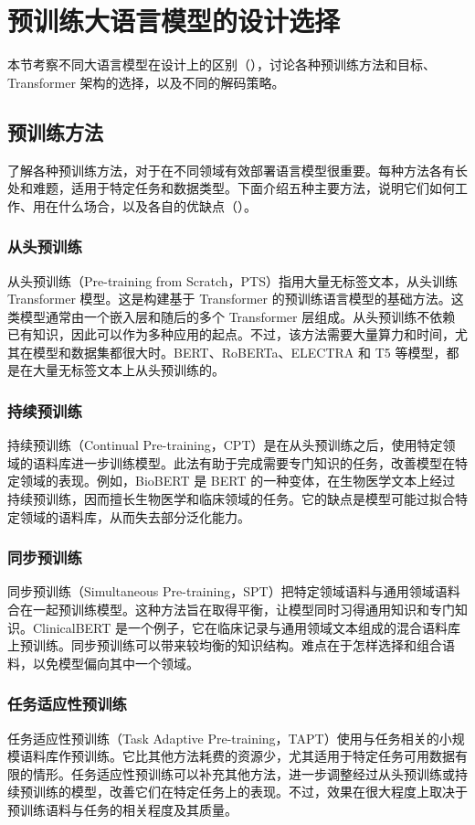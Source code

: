\section{预训练大语言模型的设计选择}
本节考察不同大语言模型在设计上的区别（），讨论各种预训练方法和目标、Transformer 架构的选择，以及不同的解码策略。

\subsection{预训练方法}
了解各种预训练方法，对于在不同领域有效部署语言模型很重要。每种方法各有长处和难题，适用于特定任务和数据类型。下面介绍五种主要方法，说明它们如何工作、用在什么场合，以及各自的优缺点（）。

\subsubsection{从头预训练}
从头预训练（Pre-training from Scratch，PTS）指用大量无标签文本，从头训练 Transformer 模型。这是构建基于 Transformer 的预训练语言模型的基础方法。这类模型通常由一个嵌入层和随后的多个 Transformer 层组成。从头预训练不依赖已有知识，因此可以作为多种应用的起点。不过，该方法需要大量算力和时间，尤其在模型和数据集都很大时。BERT、RoBERTa、ELECTRA 和 T5 等模型，都是在大量无标签文本上从头预训练的。

\subsubsection{持续预训练}
持续预训练（Continual Pre-training，CPT）是在从头预训练之后，使用特定领域的语料库进一步训练模型。此法有助于完成需要专门知识的任务，改善模型在特定领域的表现。例如，BioBERT 是 BERT 的一种变体，在生物医学文本上经过持续预训练，因而擅长生物医学和临床领域的任务。它的缺点是模型可能过拟合特定领域的语料库，从而失去部分泛化能力。

\subsubsection{同步预训练}
同步预训练（Simultaneous Pre-training，SPT）把特定领域语料与通用领域语料合在一起预训练模型。这种方法旨在取得平衡，让模型同时习得通用知识和专门知识。ClinicalBERT 是一个例子，它在临床记录与通用领域文本组成的混合语料库上预训练。同步预训练可以带来较均衡的知识结构。难点在于怎样选择和组合语料，以免模型偏向其中一个领域。

\subsubsection{任务适应性预训练}
任务适应性预训练（Task Adaptive Pre-training，TAPT）使用与任务相关的小规模语料库作预训练。它比其他方法耗费的资源少，尤其适用于特定任务可用数据有限的情形。任务适应性预训练可以补充其他方法，进一步调整经过从头预训练或持续预训练的模型，改善它们在特定任务上的表现。不过，效果在很大程度上取决于预训练语料与任务的相关程度及其质量。

